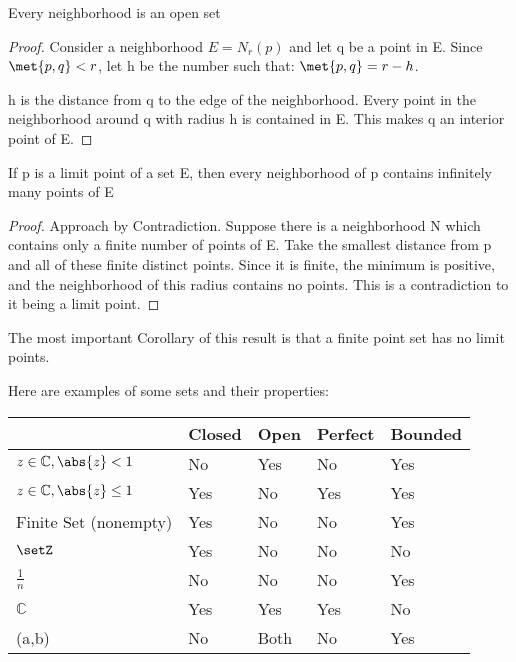 \documentclass[12pt, letterpaper]{paper}
\begin{document}
\begin{theorem}
  \label{thr:2.19}
  Every neighborhood is an open set
\end{theorem}
\begin{proof}
  Consider a neighborhood $E = N_r (p)$ and let q be a point in
  E. Since $\met{p,q} < r$, let h be the number such that:
  $\met{p,q} = r - h$.

  h is the distance from q to the edge of the neighborhood. Every
  point in the neighborhood around q with radius h is contained in
  E. This makes q an interior point of E.
\end{proof}

\begin{theorem}
  \label{thr:2.20}
  If p is a limit point of a set E, then every neighborhood of p
  contains infinitely many points of E
\end{theorem}
\begin{proof}
  Approach by Contradiction. Suppose there is a neighborhood N which
  contains only a finite number of points of E. Take the smallest
  distance from p and all of these finite distinct points. Since it is
  finite, the minimum is positive, and the neighborhood of this radius
  contains no points. This is a contradiction to it being a limit
  point.
\end{proof}

The most important Corollary of this result is that a finite point set
has no limit points.


\begin{center}
  Here are examples of some sets and their properties:
  \begin{tabular}{|l|llll|}
    \hline & Closed & Open & Perfect & Bounded\\\hline
    $z \in \mathbb{C}, \abs{z} < 1$ & No & Yes & No & Yes\\\hline
    $z \in \mathbb{C}, \abs{z} \leq 1$ & Yes & No & Yes & Yes\\\hline
    Finite Set (nonempty) & Yes & No & No & Yes\\\hline
    $\setZ$ & Yes & No & No & No\\\hline
    $\frac{1}{n}$ & No & No & No & Yes\\\hline
    $\mathbb{C}$ & Yes & Yes & Yes & No\\\hline
    (a,b) & No & Both & No & Yes\\\hline
  \end{tabular}
\end{center}
\end{document}
